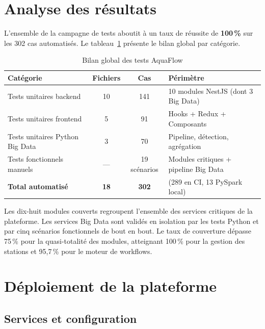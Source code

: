 \section{Analyse des résultats}

L'ensemble de la campagne de tests aboutit à un taux de réussite de \textbf{100\,\%}
sur les 302 cas automatisés. Le tableau~\ref{tab:bilan_tests} présente le bilan global
par catégorie.

\begin{table}[H]
	\centering
	\renewcommand{\arraystretch}{1.3}
	\caption{Bilan global des tests AquaFlow}
	\begin{tabular}{|p{4.8cm}|c|c|p{4.5cm}|}
		\hline
		\textbf{Catégorie} & \textbf{Fichiers} & \textbf{Cas} & \textbf{Périmètre} \\
		\hline
		Tests unitaires backend
		& 10 & 141
		& 10 modules NestJS (dont 3 Big Data) \\
		\hline
		Tests unitaires frontend
		& 5 & 91
		& Hooks + Redux + Composants \\
		\hline
		Tests unitaires Python Big Data
		& 3 & 70
		& Pipeline, détection, agrégation \\
		\hline
		Tests fonctionnels manuels
		& — & 19 scénarios
		& Modules critiques + pipeline Big Data \\
		\hline
		\textbf{Total automatisé}
		& \textbf{18} & \textbf{302}
		& (289 en CI, 13 PySpark local) \\
		\hline
	\end{tabular}
	\label{tab:bilan_tests}
\end{table}

Les dix-huit modules couverts regroupent l'ensemble des services critiques de la
plateforme. Les services Big Data sont validés en isolation par les tests Python
et par cinq scénarios fonctionnels de bout en bout. Le taux de couverture dépasse
75\,\% pour la quasi-totalité des modules, atteignant 100\,\% pour la gestion des
stations et 95,7\,\% pour le moteur de workflows.

\section{Déploiement de la plateforme}

\subsection{Services et configuration}

